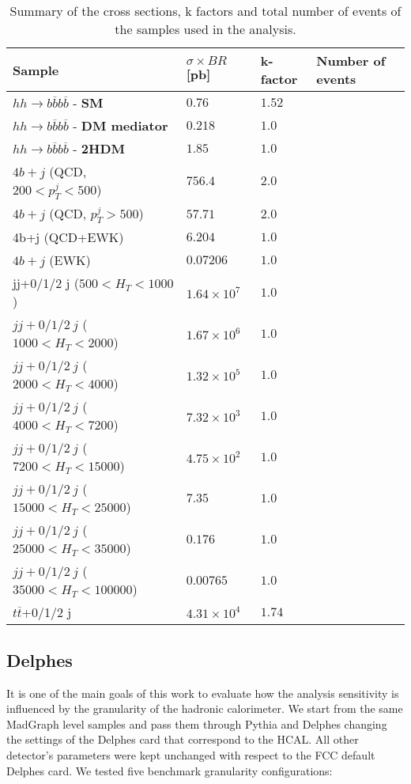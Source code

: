 \begin{table}
	\centering
	\begin{tabular}{llll}
		\toprule 
		\textbf{Sample} & $\sigma\times BR$ [pb] & k-factor & Number of events\\
		\midrule
		$hh\rightarrow b\overline{b}b\overline{b}$ - \textbf{SM} & $0.76$ & $1.52$ &\\
		\rowcolor{black!7} $hh\rightarrow b\overline{b}b\overline{b}$ - \textbf{DM mediator} & $0.218$ & $1.0$ & \\
		$hh\rightarrow b\overline{b}b\overline{b}$ - \textbf{2HDM} & $1.85$ & $1.0$ & \\
		\rowcolor{black!7} $4b+j$ (QCD, $200<p_T^j<500$)& $756.4$ & $2.0$ &\\
		$4b+j$ (QCD, $p_T^j>500$)& $57.71$ & $2.0$ &\\
		\rowcolor{black!7}4b+j (QCD+EWK) & $6.204$ & $1.0$ & \\
		$4b+j$ (EWK)& $0.07206$ & $1.0$ & \\
		\rowcolor{black!7} jj+0/1/2 j ($500<H_T<1000$) & $1.64\times 10^7$ &$1.0$&\\
		$jj+0/1/2 ~j$ ($1000<H_T<2000$) & $1.67\times 10^6$ &$1.0$ &\\
		\rowcolor{black!7}$jj+0/1/2 ~j$ ($2000<H_T<4000$) & $1.32\times 10^5$ & $1.0$&\\
		$jj+0/1/2 ~j$ ($4000<H_T<7200$) & $7.32\times 10^3$ & $1.0$&\\
		\rowcolor{black!7}$jj+0/1/2 ~j$ ($7200<H_T<15000$) & $4.75\times 10^2$ & $1.0$&\\
		$jj+0/1/2 ~j$ ($15000<H_T<25000$) & $7.35$ & $1.0$&\\
		\rowcolor{black!7}$jj+0/1/2 ~j$ ($25000<H_T<35000$) & $0.176$ & $1.0$&\\
		$jj+0/1/2 ~j$ ($35000<H_T<100000$) & $0.00765$ & $1.0$&\\
		\rowcolor{black!7}$t\overline{t}$+0/1/2 j & $4.31	\times 10^4$ & $1.74$ &\\
		\bottomrule
	\end{tabular}
	\caption{Summary of the cross sections, k factors and total number of events of the samples used in the analysis.}
	\label{table:samples_summary}
\end{table}

\subsection{Delphes}
\label{sec:HCALgran}

It is one of the main goals of this work to evaluate how the analysis sensitivity is influenced by the granularity of the hadronic calorimeter. We start from the same MadGraph level samples and pass them through Pythia and Delphes changing the settings of the Delphes card that correspond to the HCAL. All other detector's parameters were kept unchanged with respect to the FCC default Delphes card. 
We tested five benchmark granularity configurations:

